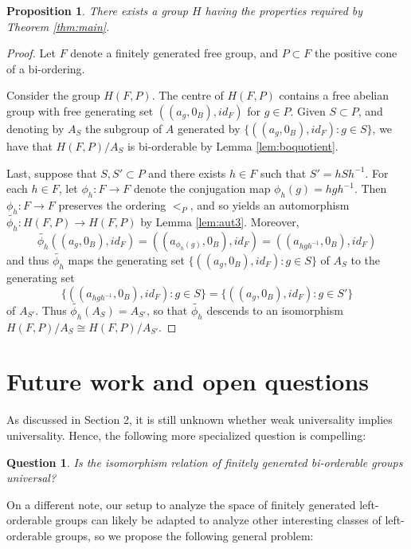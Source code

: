 \documentclass{amsart}
\newtheorem{proposition}[theorem]{Proposition}
\newtheorem{question}[theorem]{Question}
\theoremstyle{definition}
\theoremstyle{remark}
\begin{document}
\begin{proposition}
There exists a group $H$ having the properties required by Theorem \ref{thm:main}.
\end{proposition}
\begin{proof} 
Let $F$ denote a finitely generated free group, and $P \subset F$ the positive cone of a bi-ordering.  

Consider the group $H(F,P)$.  The centre of $H(F, P)$ contains a free abelian group with free generating set $((a_g, 0_B), id_F)$ for $g \in P$.  Given $S \subset P$, and denoting by $A_S$ the subgroup of $A$ generated by $\{((a_g, 0_B), id_F):g \in S\}$, we have that $H(F,P)/A_S$ is bi-orderable by Lemma \ref{lem:boquotient}.

Last, suppose that $S, S' \subset P$ and there exists $h \in F$ such that $S' = hSh^{-1}$.  For each $h \in F$, let $\phi_h \colon F \rightarrow F$ denote the conjugation map $\phi_h(g) = hgh^{-1}$. Then $\phi_h \colon F \rightarrow F$ preserves the ordering $<_P$, and so yields an automorphism $\widetilde{\phi_h} :H(F,P) \rightarrow H(F,P)$ by Lemma \ref{lem:aut3}.  Moreover, 
\[\widetilde{\phi_h}((a_g, 0_B), id_F) = ((a_{\phi_h(g)}, 0_B), id_F) = ((a_{hgh^{-1}}, 0_B), id_F)
\]
and thus $\widetilde{\phi_h}$ maps the generating set $\{((a_g, 0_B), id_F):g \in S\}$ of $A_S$ to the generating set $$\{((a_{hgh^{-1}}, 0_B), id_F):g \in S\} = \{((a_g, 0_B), id_F):g \in S'\}$$ of $A_{S'}$.  Thus $\widetilde{\phi_h}(A_S) = A_{S'}$, so that $\widetilde{\phi_h}$ descends to an isomorphism $H(F,P)/A_S \cong H(F,P)/A_{S'}$.
\end{proof}


\section{Future work and open questions}
\label{sec:questions}

As discussed in Section 2, it is still unknown whether weak universality implies universality. Hence, the following more specialized question is compelling: 
\begin{question}
    Is the isomorphism relation of finitely generated bi-orderable groups universal?
\end{question}

On a different note, our setup to analyze the space of finitely generated left-orderable groups can likely be adapted to analyze other interesting classes of left-orderable groups, so we propose the following general problem:
\end{document}
